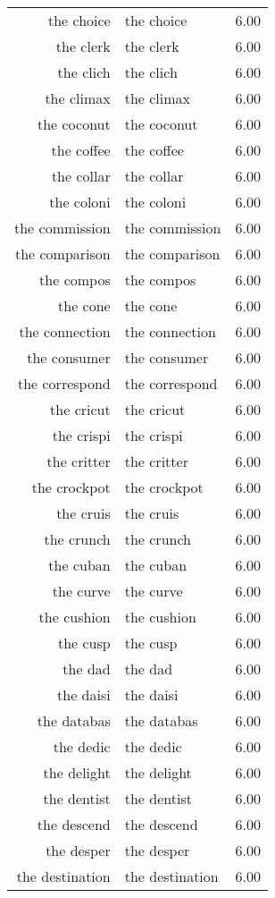 \begin{table}[ht]
\begin{tabular}{rlr}
  the choice & the choice & 6.00 \\ 
  the clerk & the clerk & 6.00 \\ 
  the clich & the clich & 6.00 \\ 
  the climax & the climax & 6.00 \\ 
  the coconut & the coconut & 6.00 \\ 
  the coffee & the coffee & 6.00 \\ 
  the collar & the collar & 6.00 \\ 
  the coloni & the coloni & 6.00 \\ 
  the commission & the commission & 6.00 \\ 
  the comparison & the comparison & 6.00 \\ 
  the compos & the compos & 6.00 \\ 
  the cone & the cone & 6.00 \\ 
  the connection & the connection & 6.00 \\ 
  the consumer & the consumer & 6.00 \\ 
  the correspond & the correspond & 6.00 \\ 
  the cricut & the cricut & 6.00 \\ 
  the crispi & the crispi & 6.00 \\ 
  the critter & the critter & 6.00 \\ 
  the crockpot & the crockpot & 6.00 \\ 
  the cruis & the cruis & 6.00 \\ 
  the crunch & the crunch & 6.00 \\ 
  the cuban & the cuban & 6.00 \\ 
  the curve & the curve & 6.00 \\ 
  the cushion & the cushion & 6.00 \\ 
  the cusp & the cusp & 6.00 \\ 
  the dad & the dad & 6.00 \\ 
  the daisi & the daisi & 6.00 \\ 
  the databas & the databas & 6.00 \\ 
  the dedic & the dedic & 6.00 \\ 
  the delight & the delight & 6.00 \\ 
  the dentist & the dentist & 6.00 \\ 
  the descend & the descend & 6.00 \\ 
  the desper & the desper & 6.00 \\ 
  the destination & the destination & 6.00 \\ 

\end{tabular}
\end{table}

